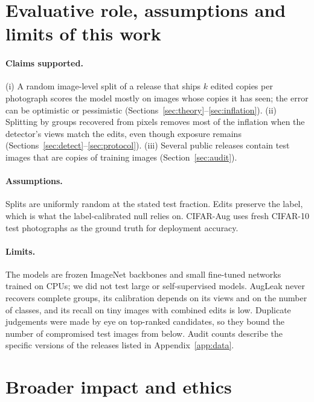 \section{Evaluative role, assumptions and limits of this work}
\label{app:role}

\paragraph{Claims supported.} (i) A random image-level split of a release that ships $k$ edited copies per photograph scores the model mostly on images whose copies it has seen; the error can be optimistic or pessimistic (Sections~\ref{sec:theory}--\ref{sec:inflation}). (ii) Splitting by groups recovered from pixels removes most of the inflation when the detector's views match the edits, even though exposure remains (Sections~\ref{sec:detect}--\ref{sec:protocol}). (iii) Several public releases contain test images that are copies of training images (Section~\ref{sec:audit}).

\paragraph{Assumptions.} Splits are uniformly random at the stated test fraction. Edits preserve the label, which is what the label-calibrated null relies on. CIFAR-Aug uses fresh CIFAR-10 test photographs as the ground truth for deployment accuracy.

\paragraph{Limits.} The models are frozen ImageNet backbones and small fine-tuned networks trained on CPUs; we did not test large or self-supervised models. AugLeak never recovers complete groups, its calibration depends on its views and on the number of classes, and its recall on tiny images with combined edits is low. Duplicate judgements were made by eye on top-ranked candidates, so they bound the number of compromised test images from below. Audit counts describe the specific versions of the releases listed in Appendix~\ref{app:data}.

\section{Broader impact and ethics}
\label{app:impact}

